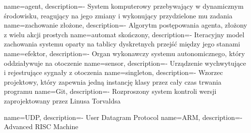  {name=agent, description={- System komputerowy przebywający w dynamicznym środowisku, reagujący na jego zmiany i wykonujący przydzielone mu zadania}}
 {name=zachowanie złożone, description={- Algorytm postępowania agenta, złożony z wielu akcji prostych}}
 {name=automat skończony, description={- Iteracyjny model zachowania systemu oparty na tablicy dyskretnych przejść między jego stanami}}
 {name=efektor, description={- Organ wykonawczy systemu autonomicznego, który oddziaływuje na otoczenie}}
 {name=sensor, description={- Urządzenie wychwytujące i rejestrujące sygnały z otoczenia}}
 {name=singleton, description={- Wzorzec projektowy, który zapewnia jedną instancję klasy przez cały czas trwania programu}}
 {name=Git, description={- Rozproszony system kontroli wersji zaprojektowany przez Linusa Torvaldsa}}

 {name=UDP, description={- User Datagram Protocol}}
 {name=ARM, description={- Advanced RISC Machine}}
